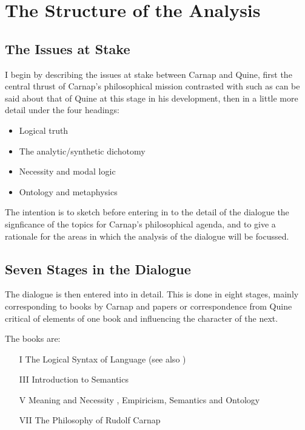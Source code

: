 \section{The Structure of the Analysis}

\subsection{The Issues at Stake}

I begin by describing the issues at stake between Carnap and Quine,
first the central thrust of Carnap's philosophical mission contrasted
with such as can be said about that of Quine at this stage in his
development, then in a little more detail under the four headings:

\begin{itemize}
\item Logical truth
\item The analytic/synthetic dichotomy
\item Necessity and modal logic
\item Ontology and metaphysics
\end{itemize}

The intention is to sketch before entering in to the detail of the dialogue
the signficance of the topics for Carnap's philosophical agenda, and
to give a rationale for the areas in which the analysis of the dialogue
will be focussed.

\subsection{Seven Stages in the Dialogue}

The dialogue is then entered into in detail.
This is done in eight stages, mainly corresponding to books by Carnap
and papers or correspondence from Quine critical of elements of one
book and influencing the character of the next.

The books are:

\begin{itemize}
\item[I] The Logical Syntax of Language \cite{carnap34,carnap37} (see also \cite{carnap35})
\item[III] Introduction to Semantics \cite{carnap42}
\item[V] Meaning and Necessity \cite{carnap47}, Empiricism, Semantics and Ontology \cite{carnap50}
\item[VII] The Philosophy of Rudolf Carnap \cite{carnap63}
\end{itemize}

